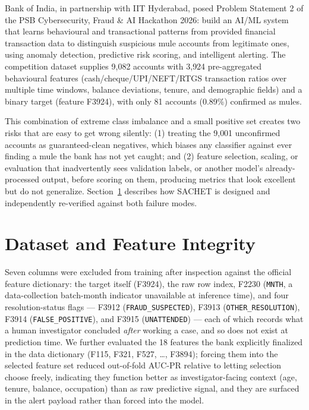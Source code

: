 \documentclass{article}
\begin{document}
Bank of India, in partnership with IIT Hyderabad, posed Problem Statement 2 of the PSB
Cybersecurity, Fraud \& AI Hackathon 2026: build an AI/ML system that learns behavioural
and transactional patterns from provided financial transaction data to distinguish
suspicious mule accounts from legitimate ones, using anomaly detection, predictive risk
scoring, and intelligent alerting. The competition dataset supplies 9{,}082 accounts with
3{,}924 pre-aggregated behavioural features (cash/cheque/UPI/NEFT/RTGS transaction ratios
over multiple time windows, balance deviations, tenure, and demographic fields) and a
binary target (feature F3924), with only 81 accounts (0.89\%) confirmed as mules.

This combination of extreme class imbalance and a small positive set creates two risks
that are easy to get wrong silently: (1) treating the 9{,}001 unconfirmed accounts as
guaranteed-clean negatives, which biases any classifier against ever finding a mule the
bank has not yet caught; and (2) feature selection, scaling, or evaluation that
inadvertently sees validation labels, or another model's already-processed output, before
scoring on them, producing metrics that look excellent but do not generalize. Section~\ref{sec:format}
describes how SACHET is designed and independently re-verified against both failure modes.

\section{Dataset and Feature Integrity}
\label{sec:format}

Seven columns were excluded from training after inspection against the official feature
dictionary: the target itself (F3924), the raw row index, F2230 (\texttt{MNTH}, a
data-collection batch-month indicator unavailable at inference time), and four
resolution-status flags --- F3912 (\texttt{FRAUD\_SUSPECTED}), F3913
(\texttt{OTHER\_RESOLUTION}), F3914 (\texttt{FALSE\_POSITIVE}), and F3915
(\texttt{UNATTENDED}) --- each of which records what a human investigator concluded
\emph{after} working a case, and so does not exist at prediction time. We further
evaluated the 18 features the bank explicitly finalized in the data dictionary
(F115, F321, F527, \ldots, F3894); forcing them into the selected feature set reduced
out-of-fold AUC-PR relative to letting selection choose freely, indicating they function
better as investigator-facing context (age, tenure, balance, occupation) than as raw
predictive signal, and they are surfaced in the alert payload rather than forced into
the model.
\end{document}
